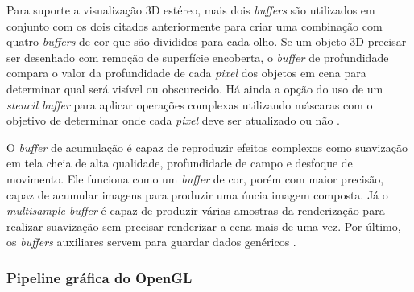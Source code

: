 \begin{figure}[h!]
	\centering
\end{figure}
\nocite{stcbuf}

Para suporte a visualização 3D estéreo, mais dois \textit{buffers} são utilizados em conjunto com os dois citados anteriormente para criar uma combinação com quatro \textit{buffers} de cor que são divididos para cada olho. Se um objeto 3D precisar ser desenhado com remoção de superfície encoberta, o \textit{buffer} de profundidade compara o valor da profundidade de cada \textit{pixel} dos objetos em cena para determinar qual será visível ou obscurecido. Há ainda a opção do uso de um \textit{stencil buffer} para aplicar operações complexas utilizando máscaras com o objetivo de determinar onde cada \textit{pixel} deve ser atualizado ou não \cite{GLSLBook}.

O \textit{buffer} de acumulação é capaz de reproduzir efeitos complexos como suavização em tela cheia de alta qualidade, profundidade de campo e desfoque de movimento. Ele funciona como um \textit{buffer} de cor, porém com maior precisão, capaz de acumular imagens para produzir uma úncia imagem composta. Já o \textit{multisample buffer} é capaz de produzir várias amostras da renderização para realizar suavização sem precisar renderizar a cena mais de uma vez. Por último, os \textit{buffers} auxiliares servem para guardar dados genéricos \cite{GLSLBook}. 

\subsubsection{Pipeline gráfica do OpenGL}
\label{sec:pipeline-opengl}

